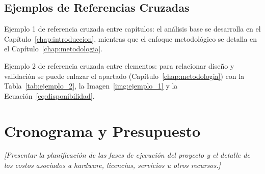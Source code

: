 \subsection{Ejemplos de Referencias Cruzadas}
Ejemplo 1 de referencia cruzada entre capítulos: el análisis base se desarrolla en el Capítulo~\ref{chap:introduccion}, mientras que el enfoque metodológico se detalla en el Capítulo~\ref{chap:metodologia}.

Ejemplo 2 de referencia cruzada entre elementos: para relacionar diseño y validación se puede enlazar el apartado \emph{} (Capítulo~\ref{chap:metodologia}) con la Tabla~\ref{tab:ejemplo_2}, la Imagen~\ref{img:ejemplo_1} y la Ecuación~\ref{eq:disponibilidad}.

\section{Cronograma y Presupuesto}
\textit{[Presentar la planificación de las fases de ejecución del proyecto y el detalle de los costos asociados a hardware, licencias, servicios u otros recursos.]}
